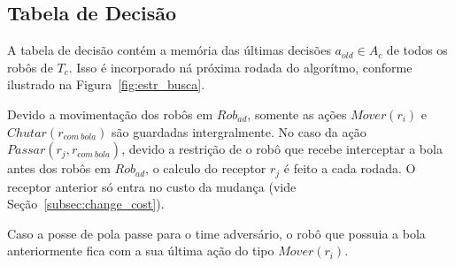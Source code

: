 \subsection{Tabela de Decisão}\label{sec:tab_dec}
A tabela de decisão contém a memória das últimas
decisões $a_{old} \in A_c$ de todos os robôs de $T_c$.
Isso é incorporado ná próxima rodada do algorítmo,
conforme ilustrado na Figura~\ref{fig:estr_busca}.


Devido a movimentação dos robôs em $Rob_{ad}$, somente as
ações $Mover(r_i)$ e $Chutar(r_{com{\ }bola})$ são guardadas
intergralmente. No caso da ação $Passar(r_j, r_{com{\ }bola})$,
devido a restrição de o robô que recebe interceptar a bola
antes dos robôs em $Rob_{ad}$, o calculo do receptor $r_j$ é
feito a cada rodada. O receptor anterior só entra no custo
da mudança (vide Seção~\ref{subsec:change_cost}). 

Caso a posse de pola passe para o time adversário, o robô
que possuia a bola anteriormente fica com a sua última
ação do tipo $Mover(r_i)$.
